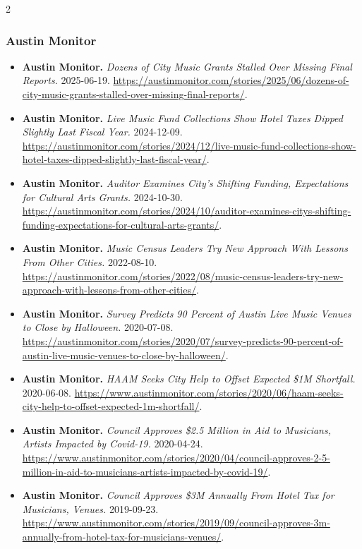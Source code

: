 {\begin{multicols}{2}
\subsubsection*{Austin Monitor}
\begin{itemize}[itemsep=0pt,topsep=1pt,parsep=0pt,partopsep=0pt,leftmargin=1em]
\item \textbf{Austin Monitor.} \textit{Dozens of City Music Grants Stalled Over Missing Final Reports.} 2025-06-19. \url{https://austinmonitor.com/stories/2025/06/dozens-of-city-music-grants-stalled-over-missing-final-reports/}.
\item \textbf{Austin Monitor.} \textit{Live Music Fund Collections Show Hotel Taxes Dipped Slightly Last Fiscal Year.} 2024-12-09. \url{https://austinmonitor.com/stories/2024/12/live-music-fund-collections-show-hotel-taxes-dipped-slightly-last-fiscal-year/}.
\item \textbf{Austin Monitor.} \textit{Auditor Examines City’s Shifting Funding, Expectations for Cultural Arts Grants.} 2024-10-30. \url{https://austinmonitor.com/stories/2024/10/auditor-examines-citys-shifting-funding-expectations-for-cultural-arts-grants/}.
\item \textbf{Austin Monitor.} \textit{Music Census Leaders Try New Approach With Lessons From Other Cities.} 2022-08-10. \url{https://austinmonitor.com/stories/2022/08/music-census-leaders-try-new-approach-with-lessons-from-other-cities/}.
\item \textbf{Austin Monitor.} \textit{Survey Predicts 90 Percent of Austin Live Music Venues to Close by Halloween.} 2020-07-08. \url{https://austinmonitor.com/stories/2020/07/survey-predicts-90-percent-of-austin-live-music-venues-to-close-by-halloween/}.
\item \textbf{Austin Monitor.} \textit{HAAM Seeks City Help to Offset Expected \$1M Shortfall.} 2020-06-08. \url{https://www.austinmonitor.com/stories/2020/06/haam-seeks-city-help-to-offset-expected-1m-shortfall/}.
\item \textbf{Austin Monitor.} \textit{Council Approves \$2.5 Million in Aid to Musicians, Artists Impacted by Covid-19.} 2020-04-24. \url{https://www.austinmonitor.com/stories/2020/04/council-approves-2-5-million-in-aid-to-musicians-artists-impacted-by-covid-19/}.
\item \textbf{Austin Monitor.} \textit{Council Approves \$3M Annually From Hotel Tax for Musicians, Venues.} 2019-09-23. \url{https://www.austinmonitor.com/stories/2019/09/council-approves-3m-annually-from-hotel-tax-for-musicians-venues/}.

\end{itemize}
\end{multicols}}
